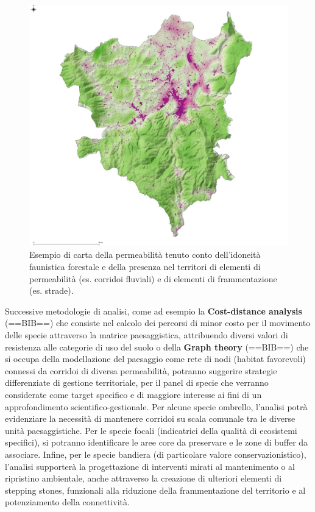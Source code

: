 \documentclass[
]{book}
\begin{document}
\begin{figure}

{\centering \includegraphics[width=1\linewidth]{./figs/cartaBioperm} 

}

\caption{Esempio di carta della permeabilità tenuto conto dell'idoneità faunistica forestale e della presenza nel territori di elementi di permeabilità (es. corridoi fluviali) e di elementi di frammentazione (es. strade).}\label{fig:cbioperm}
\end{figure}

Successive metodologie di analisi, come ad esempio la \textbf{Cost-distance analysis} (==BIB==) che consiste nel calcolo dei percorsi di minor costo per il movimento delle specie attraverso la matrice paesaggistica, attribuendo diversi valori di resistenza alle categorie di uso del suolo o della \textbf{Graph theory} (==BIB==) che si occupa della modellazione del paesaggio come rete di nodi (habitat favorevoli) connessi da corridoi di diversa permeabilità, potranno suggerire strategie differenziate di gestione territoriale, per il panel di specie che verranno considerate come target specifico e di maggiore interesse ai fini di un approfondimento scientifico-gestionale.
Per alcune specie ombrello, l'analisi potrà evidenziare la necessità di mantenere corridoi su scala comunale tra le diverse unità paesaggistiche.
Per le specie focali (indicatrici della qualità di ecosistemi specifici), si potranno identificare le aree core da preservare e le zone di buffer da associare.
Infine, per le specie bandiera (di particolare valore conservazionistico), l'analisi supporterà la progettazione di interventi mirati al mantenimento o al ripristino ambientale, anche attraverso la creazione di ulteriori elementi di stepping stones, funzionali alla riduzione della frammentazione del territorio e al potenziamento della connettività.
\end{document}
